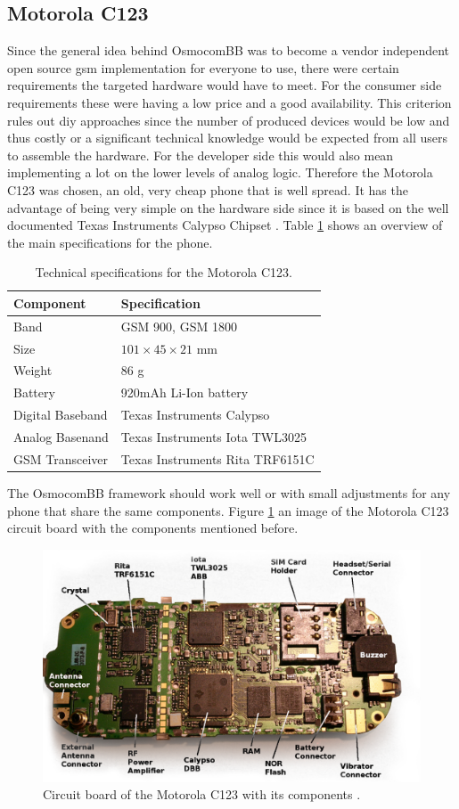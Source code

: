 \subsection{Motorola C123}
\label{sec:osmo_phones}
Since the general idea behind OsmocomBB was to become a vendor independent open source \gls{gsm} implementation for everyone to use, there were certain requirements the targeted hardware would have to meet.
For the consumer side requirements these were having a low price and a good availability.
This criterion rules out \gls{diy} approaches since the number of produced devices would be low and thus costly or a significant technical knowledge would be expected from all users to assemble the hardware.
For the developer side this would also mean implementing a lot on the lower levels of analog logic.
Therefore the Motorola C123 was chosen, an old, very cheap phone that is well spread.
It has the advantage of being very simple on the hardware side since it is based on the well documented Texas Instruments Calypso Chipset \cite{osmo_slides}.
Table \ref{tab:c123_specs} shows an overview of the main specifications for the phone.
\begin{table}
\centering
	\begin{tabular}{ll}
	\toprule
	Component			&Specification\\
	\midrule
	Band 				&GSM 900, GSM 1800\\
	Size				&$101\times 45\times 21$ mm\\
	Weight				&86 g\\
	Battery				&920mAh Li-Ion battery\\
	Digital Baseband	&Texas Instruments Calypso\\
	Analog Basenand		&Texas Instruments Iota TWL3025\\
	GSM Transceiver		&Texas Instruments Rita TRF6151C\\
	\bottomrule
	\end{tabular}
	\caption{Technical specifications for the Motorola C123.}
	\label{tab:c123_specs}
\end{table}
The OsmocomBB framework should work well or with small adjustments for any phone that share the same components.
Figure \ref{fig:osmo_c123} an image of the Motorola C123 circuit board with the components mentioned before.
\begin{figure}
\centering
	\includegraphics[width=.9\textwidth]{../Images/c123_pcb}
	\caption{Circuit board of the Motorola C123 with its components \cite{osmo_wiki_c123}.}
	\label{fig:osmo_c123}
\end{figure}
